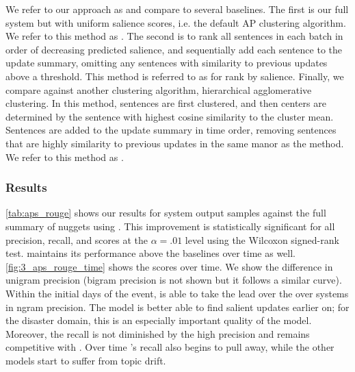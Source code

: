    We refer to our approach as \sap{} and compare to 
    several 
    baselines.
    The first is our full system but with uniform salience scores, i.e.
    the default AP clustering algorithm. We refer to
    this method as \ap.
    The second is to rank all sentences in each batch in order of decreasing
    predicted
    salience, and sequentially add each sentence to the update summary, 
    omitting
    any sentences with similarity to previous updates above a threshold.
    This method is referred to as \ranksal{} for rank by salience.
    Finally, we compare against another clustering algorithm,
    hierarchical agglomerative clustering.
    In this method, sentences are first clustered, 
    and then centers are determined by the sentence
    with  highest  cosine  similarity  to  the  cluster
    mean. 
    Sentences are added to the update summary in time order, 
    removing sentences that are highly similarity to previous updates in the
    same manor as the \ranksal{} method. We refer to this method as 
    \hac.





    \subsubsection{Results}

\autoref{tab:aps_rouge}  shows  our  results  for  system  output
samples against the full summary of nuggets using \rouge. 
This improvement is statistically significant  for  all  \ngram{}
precision,  recall,  and \fmeasure{} scores at the
$\alpha=.01$
level using the Wilcoxon
signed-rank test.
\sap{}
maintains    its    performance
above  the  baselines  over  time  as  well.
\autoref{fig:3_aps_rouge_time}  shows  the    scores  over  
time.
We  show  the  difference  in  unigram  precision
(bigram  precision  is  not  shown  but  it  follows a
similar  curve).
Within  the  initial  days  of  the
event,  \sap{}
is  able  to  take  the  lead
over  the  over  systems  in  ngram  precision.   The
\sap{}
model is better able to find salient
updates earlier on; for the disaster domain, this is
an especially important quality of the model.
Moreover, the \sap{} recall is not diminished by the high 
precision and remains competitive with \ap. 
Over time \sap's recall also begins to pull away, 
while the other models start to suffer from topic drift.


